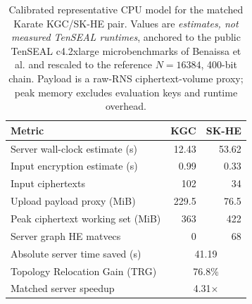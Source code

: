 \begin{table}[t]
\centering
\caption{Calibrated representative CPU model for the matched Karate KGC/SK-HE pair. Values are \emph{estimates, not measured TenSEAL runtimes}, anchored to the public TenSEAL c4.2xlarge microbenchmarks of Benaissa et al. and rescaled to the reference $N=16384$, 400-bit chain. Payload is a raw-RNS ciphertext-volume proxy; peak memory excludes evaluation keys and runtime overhead.}
\label{tab:modeled-ckks}
\small
\begin{tabular}{lrr}
\toprule
Metric & KGC & SK-HE \\
\midrule
Server wall-clock estimate (s) & 12.43 & 53.62 \\
Input encryption estimate (s) & 0.99 & 0.33 \\
Input ciphertexts & 102 & 34 \\
Upload payload proxy (MiB) & 229.5 & 76.5 \\
Peak ciphertext working set (MiB) & 363 & 422 \\
Server graph HE matvecs & 0 & 68 \\
\midrule
Absolute server time saved (s) & \multicolumn{2}{c}{41.19} \\
Topology Relocation Gain (TRG) & \multicolumn{2}{c}{76.8\%} \\
Matched server speedup & \multicolumn{2}{c}{4.31$\times$} \\
\bottomrule
\end{tabular}
\end{table}
